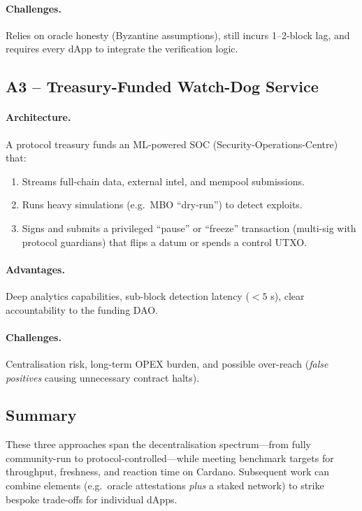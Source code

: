 \documentclass{scrreport}
\begin{document}
\paragraph{Challenges.}
Relies on oracle honesty (Byzantine assumptions),
still incurs 1–2-block lag, and requires every dApp to integrate the
verification logic.

\subsection{A3 – Treasury-Funded Watch-Dog Service}

\paragraph{Architecture.}
A protocol treasury funds an ML-powered SOC (Security-Operations-Centre)
that:
\begin{enumerate}
  \item Streams full-chain data, external intel, and mempool submissions.
  \item Runs heavy simulations (e.g.\ MBO “dry-run”) to detect exploits.
  \item Signs and submits a privileged “pause” or “freeze” transaction
        (multi-sig with protocol guardians) that flips a datum or spends a
        control UTXO.
\end{enumerate}

\paragraph{Advantages.}
Deep analytics capabilities, sub-block detection latency ($<\!5$ s),
clear accountability to the funding DAO.

\paragraph{Challenges.}
Centralisation risk, long-term OPEX burden, and possible over-reach
(\emph{false positives} causing unnecessary contract halts).

\subsection*{Summary}
These three approaches span the decentralisation spectrum—from fully
community-run to protocol-controlled—while meeting benchmark targets
for throughput, freshness, and reaction time on Cardano.  Subsequent work
can combine elements (e.g.\ oracle attestations \emph{plus} a staked network)
to strike bespoke trade-offs for individual dApps.
\end{document}
